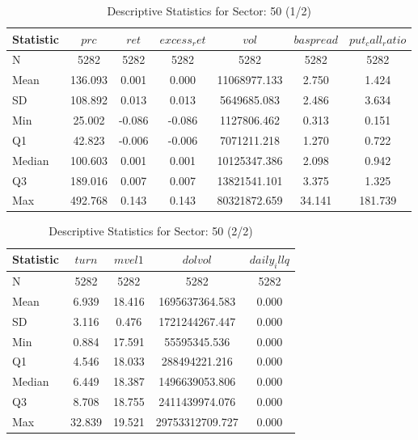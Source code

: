     \begin{table}[H]
    \centering

    
    \caption{Descriptive Statistics for Sector: 50 (1/2)}
    \label{tab:sec50_a}
    
    \begin{tabular}{lcccccc}
    \toprule
    Statistic & $prc$ & $ret$ & $excess_ret$ & $vol$ & $baspread$ & $put_call_ratio$ \\\midrule
    N & 5282 & 5282 & 5282 & 5282 & 5282 & 5282 \\
    Mean & 136.093 & 0.001 & 0.000 & 11068977.133 & 2.750 & 1.424 \\
    SD & 108.892 & 0.013 & 0.013 & 5649685.083 & 2.486 & 3.634 \\
    Min & 25.002 & -0.086 & -0.086 & 1127806.462 & 0.313 & 0.151 \\
    Q1 & 42.823 & -0.006 & -0.006 & 7071211.218 & 1.270 & 0.722 \\
    Median & 100.603 & 0.001 & 0.001 & 10125347.386 & 2.098 & 0.942 \\
    Q3 & 189.016 & 0.007 & 0.007 & 13821541.101 & 3.375 & 1.325 \\
    Max & 492.768 & 0.143 & 0.143 & 80321872.659 & 34.141 & 181.739 \\
    \bottomrule
    \end{tabular}

    \end{table}
    
    \begin{table}[H]
    \centering

    
    \caption{Descriptive Statistics for Sector: 50 (2/2)}
    \label{tab:sec50_b}
    
    \begin{tabular}{lcccc}
    \toprule
    Statistic & $turn$ & $mvel1$ & $dolvol$ & $daily_illq$ \\\midrule
    N & 5282 & 5282 & 5282 & 5282 \\
    Mean & 6.939 & 18.416 & 1695637364.583 & 0.000 \\
    SD & 3.116 & 0.476 & 1721244267.447 & 0.000 \\
    Min & 0.884 & 17.591 & 55595345.536 & 0.000 \\
    Q1 & 4.546 & 18.033 & 288494221.216 & 0.000 \\
    Median & 6.449 & 18.387 & 1496639053.806 & 0.000 \\
    Q3 & 8.708 & 18.755 & 2411439974.076 & 0.000 \\
    Max & 32.839 & 19.521 & 29753312709.727 & 0.000 \\
    \bottomrule
    \end{tabular}

    \end{table}
    
